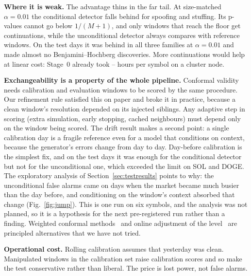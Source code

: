 \documentclass[journal]{IEEEtran}
\begin{document}
\textbf{Where it is weak.} The advantage thins in the far tail. At size-matched $\alpha=0.01$ the conditional
detector falls behind for spoofing and stuffing. Its p-values cannot go below $1/(M+1)$, and only windows that
reach the floor get \Mrefine{} continuations, while the unconditional detector always compares with \nRef{}
reference windows. On the test days it was behind in all three families at $\alpha=0.01$ and made almost no
Benjamini--Hochberg discoveries. More continuations would help at linear cost: Stage~0 already took
\hoursLo--\hoursHi{} hours per symbol on a cluster node.

\textbf{Exchangeability is a property of the whole pipeline.} Conformal validity needs calibration and evaluation
windows to be scored by the same procedure. Our refinement rule satisfied this on paper and broke it in practice,
because a clean window's resolution depended on its injected siblings. Any adaptive step in scoring (extra
simulation, early stopping, cached neighbours) must depend only on the window being scored. The drift result
makes a second point: a single calibration day is a fragile reference even for a model that conditions on
context, because the generator's errors change from day to day. Day-before calibration is the simplest fix, and
on the test days it was enough for the conditional detector but not for the unconditional one, which exceeded
the limit on SOL and DOGE. The exploratory analysis of Section~\ref{sec:testresults} points to why: the
unconditional false alarms came on days when the market became much busier than the day before, and conditioning
on the window's context absorbed that change (Fig.~\ref{fig:jump}). This is one run on six symbols, and the
analysis was not planned, so it is a hypothesis for the next pre-registered run rather than a finding. Weighted conformal methods~\cite{tibshirani2019conformal,barber2023conformal} and online adjustment of the
level~\cite{gibbs2021adaptive} are principled alternatives that we have not tried.

\textbf{Operational cost.} Rolling calibration assumes that yesterday was clean. Manipulated windows in the
calibration set raise calibration scores and so make the test conservative rather than liberal. The price is
lost power, not false alarms.
\end{document}
